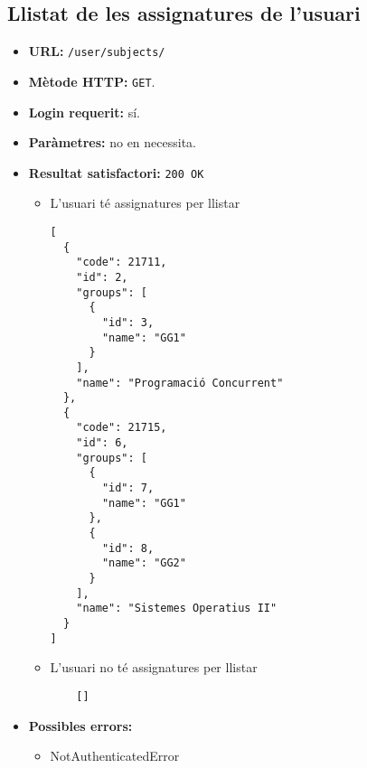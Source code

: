 \subsection{Llistat de les assignatures de l'usuari}
\begin{itemize}
\item \textbf{\ac{URL}:} \texttt{/user/subjects/}
\item \textbf{Mètode \ac{HTTP}: } \texttt{GET}.
\item \textbf{Login requerit:} sí.
\item \textbf{Paràmetres:} no en necessita.

\item \textbf{Resultat satisfactori:} \texttt{200 OK}
	\begin{itemize}
		\item L'usuari té assignatures per llistar
	\begin{verbatim}
[
  {
    "code": 21711,
    "id": 2,
    "groups": [
      {
        "id": 3,
        "name": "GG1"
      }
    ],
    "name": "Programació Concurrent"
  },
  {
    "code": 21715,
    "id": 6,
    "groups": [
      {
        "id": 7,
        "name": "GG1"
      },
      {
        "id": 8,
        "name": "GG2"
      }
    ],
    "name": "Sistemes Operatius II"
  }
]
	\end{verbatim}
	
	\item L'usuari no té assignatures per llistar
	
	\begin{verbatim}
	[]
	\end{verbatim}
	\end{itemize}


\item \textbf{Possibles errors:}
	\begin{itemize}
		\item NotAuthenticatedError
	\end{itemize}
\end{itemize}
